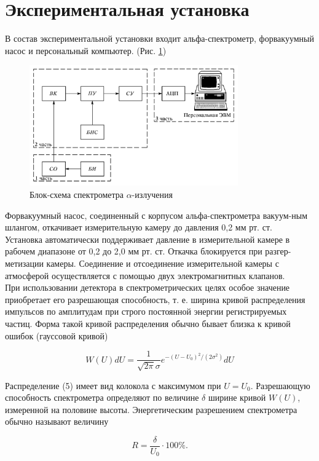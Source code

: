 \documentclass[a4paper, 12pt]{article}
\begin{document}
\section{Экспериментальная установка}
В состав экспериментальной установки входит альфа-спектрометр, форвакуумный насос и персональный компьютер. (Рис. \ref{fig:scheme})

\begin{figure}[h]
  \centering
  \includegraphics[width=0.8\textwidth]{ust.png}  \caption{Блок-схема спектрометра $\alpha$-излучения}
  \label{fig:scheme}
\end{figure}

Форвакуумный насос, соединенный с корпусом альфа-спектрометра вакуум-ным шлангом, откачивает измерительную камеру до давления 0,2 мм рт. ст.\\
Установка автоматически поддерживает давление в измерительной камере в рабочем диапазоне от 0,2 до 2,0 мм рт. ст. Откачка блокируется при разгер-метизации камеры. Соединение и отсоединение измерительной камеры с атмосферой осуществляется с помощью двух электромагнитных клапанов.\\

При использовании детектора в спектрометрических целях особое значение приобретает его разрешающая способность, т. е. ширина кривой распределения импульсов по амплитудам при строго постоянной энергии регистрируемых частиц. Форма такой кривой распределения обычно бывает близка к кривой ошибок (гауссовой кривой)

$$
W(U) d U=\frac{1}{\sqrt{2 \pi} \sigma} e^{-\left(U-U_0\right)^2 /\left(2 \sigma^2\right)} d U
$$

Распределение (5) имеет вид колокола с максимумом при $U=U_0$. Разрешающую способность спектрометра определяют по величине $\delta$ ширине кривой $W(U)$, измеренной на половине высоты. Энергетическим разрешением спектрометра обычно называют величину

$$
R=\frac{\delta}{U_0} \cdot 100 \% .
$$
\end{document}
